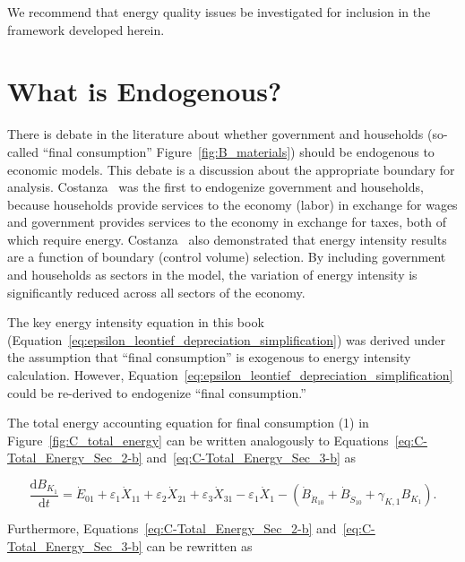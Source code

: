 We recommend that energy quality issues be investigated for inclusion
in the framework developed herein.


\section{What is Endogenous?}
\label{sec:what_is_endogenous}

There is debate in the literature about whether government 
and households 
(so-called ``final consumption'' Figure~\ref{fig:B_materials}) 
should be endogenous to economic models.
This debate is a discussion about the appropriate boundary
for analysis.
Costanza~\cite{Costanza:1980ww} was the first to endogenize government and households, 
because households provide services to the economy (labor) in exchange for wages 
and government provides services to the economy in exchange for taxes, 
both of which require energy. 
Costanza~\cite{Costanza:1980ww} also demonstrated that 
energy intensity results
are a function of boundary (control volume) selection. 
By including government and households 
as sectors in the model, 
the variation of energy intensity is significantly reduced 
across all sectors of the economy. 

The key energy intensity equation in this book
(Equation~\ref{eq:epsilon_leontief_depreciation_simplification})
was derived under the assumption that ``final consumption''
is exogenous to energy intensity calculation.
However, Equation~\ref{eq:epsilon_leontief_depreciation_simplification}
could be re-derived to endogenize 
``final consumption.''

The total energy accounting equation for final consumption (1)
in Figure~\ref{fig:C_total_energy} can be written 
analogously to Equations~\ref{eq:C-Total_Energy_Sec_2-b}
and~\ref{eq:C-Total_Energy_Sec_3-b} as

\begin{equation} \label{eq:C-Total_Energy_Sec_1-unfinished}
	\frac{\mathrm{d}B_{K_{1}}}{\mathrm{d}t}
	= \dot{E}_{01}
	+ \varepsilon_{1} \dot{X}_{11}
	+ \varepsilon_{2} \dot{X}_{21}
	+ \varepsilon_{3} \dot{X}_{31}
	- \varepsilon_{1} \dot{X}_{1}
	- \left( \dot{B}_{\dot{R}_{10}} 
							+ \dot{B}_{\dot{S}_{10}}
							+ \gamma_{K,1} B_{K_{1}}
							\right).
\end{equation}

\noindent{}Furthermore, Equations~\ref{eq:C-Total_Energy_Sec_2-b}
and~\ref{eq:C-Total_Energy_Sec_3-b}
can be rewritten as 

